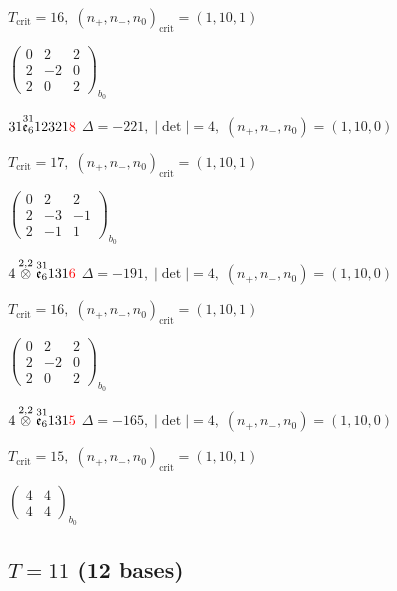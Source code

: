 \documentclass[10pt]{article}
\begin{document}
\hspace{1em}$T_{\text{crit}}=16,\; (n_+,n_-,n_0)_{\text{crit}}=(1,10,1)$

\hspace{2em}$\left(\begin{smallmatrix}0 & 2 & 2 \\ 2 & -2 & 0 \\ 2 & 0 & 2\end{smallmatrix}\right)_{\!b_0}$

$31\overset{31}{\mathfrak{e}_6}12321\textcolor{red}{8}$ \quad $\Delta=-221,\; |\det|=4,\; (n_+,n_-,n_0)=(1,10,0)$

\hspace{1em}$T_{\text{crit}}=17,\; (n_+,n_-,n_0)_{\text{crit}}=(1,10,1)$

\hspace{2em}$\left(\begin{smallmatrix}0 & 2 & 2 \\ 2 & -3 & -1 \\ 2 & -1 & 1\end{smallmatrix}\right)_{\!b_0}$

\smallskip

$4\overset{2,2}{\otimes}\overset{31}{\mathfrak{e}_6}131\textcolor{red}{6}$ \quad $\Delta=-191,\; |\det|=4,\; (n_+,n_-,n_0)=(1,10,0)$

\hspace{1em}$T_{\text{crit}}=16,\; (n_+,n_-,n_0)_{\text{crit}}=(1,10,1)$

\hspace{2em}$\left(\begin{smallmatrix}0 & 2 & 2 \\ 2 & -2 & 0 \\ 2 & 0 & 2\end{smallmatrix}\right)_{\!b_0}$

$4\overset{2,2}{\otimes}\overset{31}{\mathfrak{e}_6}131\textcolor{red}{5}$ \quad $\Delta=-165,\; |\det|=4,\; (n_+,n_-,n_0)=(1,10,0)$

\hspace{1em}$T_{\text{crit}}=15,\; (n_+,n_-,n_0)_{\text{crit}}=(1,10,1)$

\hspace{2em}$\left(\begin{smallmatrix}4 & 4 \\ 4 & 4\end{smallmatrix}\right)_{\!b_0}$


\subsection*{$T = 11$ \quad (12 bases)}
\smallskip
\end{document}
